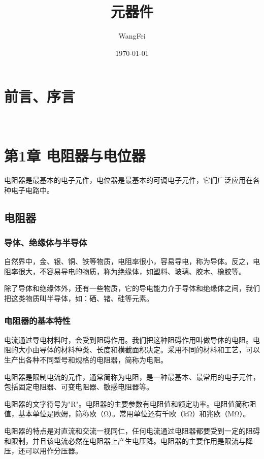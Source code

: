 \documentclass[12pt,UTF8]{ctexbook}
\title{\heiti\zihao{0} 元器件}
\author{WangFei}
\date{\today}
\begin{document}
\maketitle
\tableofcontents

\frontmatter
\chapter{前言、序言}

\mainmatter

~\\

\chapter{第1章 电阻器与电位器}

电阻器是最基本的电子元件，电位器是最基本的可调电子元件，它们广泛应用在各种电子电路中。

\section{电阻器}

\subsection{导体、绝缘体与半导体}

自然界中，金、银、铜、铁等物质，电阻率很小，容易导电，称为导体。反之，电阻率很大，不容易导电的物质，称为绝缘体，如塑料、玻璃、胶木、橡胶等。

除了导体和绝缘体外，还有一些物质，它的导电能力介于导体和绝缘体之间，我们把这类物质叫半导体，如：硒、锗、硅等元素。

\subsection{电阻器的基本特性}

电流通过导电材料时，会受到阻碍作用。我们把这种阻碍作用叫做导体的电阻。电阻的大小由导体的材料种类、长度和横截面积决定。采用不同的材料和工艺，可以生产出各种不同型号和规格的电阻器，简称为电阻。

电阻器是限制电流的元件，通常简称为电阻，是一种最基本、最常用的电子元件，包括固定电阻器、可变电阻器、敏感电阻器等。

电阻器的文字符号为"R"。电阻器的主要参数有电阻值和额定功率。电阻值简称阻值，基本单位是欧姆，简称欧（Ω）。常用单位还有千欧（kΩ）和兆欧（MΩ）。

电阻器的特点是对直流和交流一视同仁，任何电流通过电阻器都要受到一定的阻碍和限制，并且该电流必然在电阻器上产生电压降。电阻器的主要作用是限流与降压，还可以用作分压器。
\end{document}

